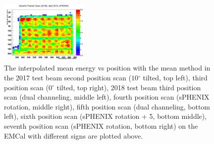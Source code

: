 \documentclass[hidelinks,11pt]{article}
\numberwithin{figure}{section}
\numberwithin{table}{section}
\newcommand{\degree}{\mbox{$^\circ$}\xspace}
\begin{document}
\begin{figure}[hbtp]
\begin{center}
\includegraphics[width=0.38\textwidth]{Plots/InterMean/Inter20187thScan.png}
\caption{The interpolated mean energy vs position with the mean method in the 2017 test beam second position scan ($10 \degree$ tilted, top left), third position scan ($0 \degree$ tilted, top right), 2018 test beam third position scan (dual channeling, middle left), fourth position scan (sPHENIX rotation, middle right), fifth position scan (dual channeling, bottom left), sixth position scan (sPHENIX rotation + 5, bottom middle),  seventh position scan (sPHENIX rotation, bottom right) on the EMCal with different signs are plotted above.}
\label{fig:MeanMethods}
\end{center}
\end{figure} 
\end{document}
